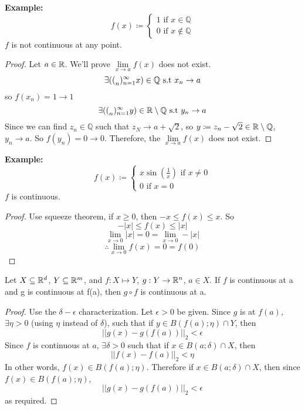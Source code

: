 \documentclass[openany]{report}
\begin{document}
\textbf{Example:} 
\[f(x) \coloneqq \begin{cases}
    1 \text{  if } x \in \mathbb{Q}\\
    0 \text{  if } x \notin \mathbb{Q}
\end{cases}\]
$f$ is not continuous at any point.
\begin{proof}
    Let $a \in \mathbb{R}$. We'll prove $\lim\limits_{x \rightarrow a}f(x)$ does not exist.
    \[\exists ({(}_n)_{n=1}^\infty x) \in \mathbb{Q} \text{ s.t } x_n \rightarrow a\]
    so $f(x_n) = 1 \rightarrow 1$
    \[\exists ({(}_n)_{n=1}^\infty y) \in \mathbb{R} \setminus \mathbb{Q} \text{ s.t } y_n \rightarrow a\]
    Since we can find $z_n \in \mathbb{Q}$ such that $z_N \rightarrow a + \sqrt{2}$, so $y \coloneqq z_n - \sqrt{2} \in \mathbb{R} \setminus \mathbb{Q}$, $y_n \rightarrow a$. So $f(y_n) = 0 \rightarrow 0$.  Therefore, the $\lim\limits_{x \rightarrow a}f(x)$ does not exist.
\end{proof}
\textbf{Example:}
\[f(x) \coloneqq \begin{cases}
    x\sin\left(\frac{1}{x}\right) \text{ if } x \neq 0\\
    0 \text{ if } x = 0
\end{cases}\]
$f$ is continuous. 
\begin{proof}
    Use squeeze theorem, if $x \geq 0$, then $-x \leq f(x) \leq x$. So 
    \[-|x| \leq f(x) \leq |x|\]
    \[\lim_{x\rightarrow 0}|x| = 0 = \lim_{x\rightarrow 0}-|x|\]
    \[\therefore \lim_{x\rightarrow 0} f(x) = 0 = f(0)\]
\end{proof}
\begin{prop}
    Let $X \subseteq \mathbb{R}^d$, $Y \subseteq \mathbb{R}^m$, and $f: X \mapsto Y$, $g: Y \rightarrow \mathbb{R}^n$, $a \in X$. If $f$ is continuous at a and g is continuous at f(a), then $g \circ f$ is continuous at a.
\end{prop}
\begin{proof}
    Use the $\delta-\epsilon$ characterization. Let $\epsilon > 0$ be given. Since $g$ is at $f(a)$, $\exists \eta > 0$ (using $\eta$ instead of $\delta$), such that if $y \in B(f(a); \eta) \cap Y$, then 
    \[||g(x) - g(f(a))||_2 < \epsilon\]
    Since $f$ is continuous at $a$, $\exists \delta > 0$ such that if $x \in B(a; \delta) \cap X$, then
    \[||f(x) - f(a)||_2 < \eta\]
    In other words, $f(x) \in B(f(a); \eta)$. Therefore if $x \in B(a; \delta) \cap X$, then since  $f(x) \in B(f(a); \eta)$, 
    \[||g(x) - g(f(a))||_2 < \epsilon\]
    as required.
\end{proof}
\end{document}
